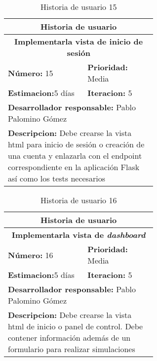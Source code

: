 \begin{table}[H]
        \centering
        \begin{tabular}{|p{0.3\linewidth}|p{0.3\linewidth}|}
          \hline
          \multicolumn{2}{|c|}{Historia de usuario}\\ \hline
          \multicolumn{2}{|c|}{\textbf{Implementarla vista de inicio de sesión}}\\ \hline
          \textbf{Número:} 15 & \textbf{Prioridad:} Media\\ \hline
          \textbf{Estimacion:}5 días & \textbf{Iteracion:} 5\\ \hline
          \multicolumn{2}{|l|}{\textbf{Desarrollador responsable:} Pablo Palomino Gómez}\\ \hline
          \multicolumn{2}{|p{0.6\linewidth}|}{\textbf{Descripcion:} Debe crearse la vista html para inicio de sesión o creación de una cuenta y enlazarla con el endpoint correspondiente en la aplicación Flask así como los tests necesarios}\\ \hline
        \end{tabular}
        \caption{Historia de usuario 15}
        \label{tab:hist15}
\end{table}
\begin{table}[H]
        \centering
        \begin{tabular}{|p{0.3\linewidth}|p{0.3\linewidth}|}
          \hline
          \multicolumn{2}{|c|}{Historia de usuario}\\ \hline
          \multicolumn{2}{|c|}{\textbf{Implementarla vista de \textit{dashboard}}}\\ \hline
          \textbf{Número:} 16 & \textbf{Prioridad:} Media\\ \hline
          \textbf{Estimacion:}5 días & \textbf{Iteracion:} 5\\ \hline
          \multicolumn{2}{|l|}{\textbf{Desarrollador responsable:} Pablo Palomino Gómez}\\ \hline
          \multicolumn{2}{|p{0.6\linewidth}|}{\textbf{Descripcion:} Debe crearse la vista html de inicio o panel de control. Debe contener información además de un formulario para realizar simulaciones}\\ \hline
        \end{tabular}
        \caption{Historia de usuario 16}
        \label{tab:hist16}
\end{table}
